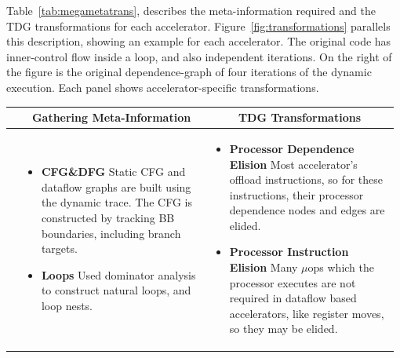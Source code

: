  

Table~\ref{tab:megametatrans}, describes the 
meta-information required and the TDG transformations for each accelerator.
Figure~\ref{fig:transformations} parallels this
description, showing an example for each accelerator.  
The original code has inner-control flow inside a loop, 
and also independent iterations.  On the right of the figure is the original
dependence-graph of four iterations of the dynamic execution. Each panel
shows accelerator-specific transformations.  


\begin{table}[h]
\begin{adjustwidth}{-0.6in}{-0.6in}
\begin{center}
\setlength{\tabcolsep}{.18em}
\def\arraystretch{0.0}
\footnotesize 
\begin{tabular}{m{0.02\linewidth}m{0.48\linewidth}m{0.48\linewidth}}

& \multicolumn{1}{c}{\textbf{Gathering Meta-Information}}
& \multicolumn{1}{c}{\textbf{TDG Transformations}}
\\   \midrule

\parbox[t]{1mm}{} 
& 
\begin{itemize}
\item \textbf{CFG\&DFG}
Static CFG and dataflow graphs are built using the dynamic trace.  
The CFG is constructed by tracking BB boundaries, including branch targets.
\item \textbf{Loops}
Used dominator analysis to construct natural loops, and loop nests. 
\end{itemize}


& 
\begin{itemize}
\item \textbf{Processor Dependence Elision}
Most accelerator's offload instructions, so for these instructions,
their processor dependence nodes and edges are elided.

\item \textbf{Processor Instruction Elision}
Many $\mu$ops which the processor executes are not required in dataflow
based accelerators, like register moves, so they may be elided.

\end{itemize}
\\ [-0.6\normalbaselineskip]  \midrule


\end{tabular}
\end{center}
\end{adjustwidth}
\end{table}
